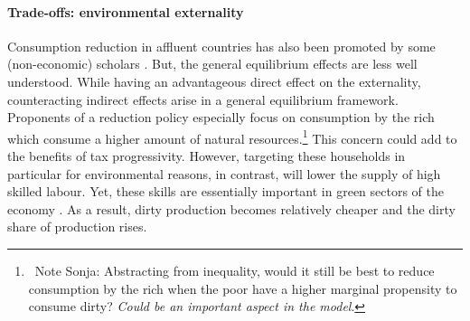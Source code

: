 % 


\paragraph{Trade-offs: environmental externality} Consumption reduction in affluent countries has also been promoted by some (non-economic) scholars \citep{Schor2005SustainableReduction, Pullinger2014WorkingDesign, Arrow2004AreMuch}. But, the general equilibrium effects are less well understood.
While having an advantageous direct effect on the externality, counteracting indirect effects arise in a general equilibrium framework. Proponents of a reduction policy especially focus on consumption by the rich which consume a higher amount of natural resources.\footnote{\ Note Sonja: Abstracting from inequality, would it still be best to reduce consumption by the rich when the poor have a higher marginal propensity to consume dirty? \textit{Could be an important aspect in the model}.}
This concern could add to the benefits of tax progressivity.
However, targeting these households in particular for environmental reasons, in contrast, will lower the supply of high skilled labour. Yet, these skills are essentially important in green sectors of the economy \citep{Consoli2016DoCapital}. As a result, dirty production becomes relatively cheaper and the dirty share of production rises. 

